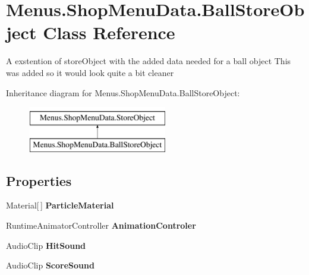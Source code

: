 \hypertarget{class_menus_1_1_shop_menu_data_1_1_ball_store_object}{}\section{Menus.\+Shop\+Menu\+Data.\+Ball\+Store\+Object Class Reference}
\label{class_menus_1_1_shop_menu_data_1_1_ball_store_object}


A exstention of store\+Object with the added data needed for a ball object This was added so it would look quite a bit cleaner  


Inheritance diagram for Menus.\+Shop\+Menu\+Data.\+Ball\+Store\+Object\+:\begin{figure}[H]
\begin{center}
\leavevmode
\includegraphics[height=2.000000cm]{class_menus_1_1_shop_menu_data_1_1_ball_store_object}
\end{center}
\end{figure}
\subsection*{Properties}
\begin{DoxyCompactItemize}
\item 
Material\mbox{[}$\,$\mbox{]} {\bfseries Particle\+Material}\hypertarget{class_menus_1_1_shop_menu_data_1_1_ball_store_object_a3b1cba2ae730d691d4ac40d58cf9113c}{}\label{class_menus_1_1_shop_menu_data_1_1_ball_store_object_a3b1cba2ae730d691d4ac40d58cf9113c}

\item 
Runtime\+Animator\+Controller {\bfseries Animation\+Controler}\hypertarget{class_menus_1_1_shop_menu_data_1_1_ball_store_object_a804f3abdad7315e197f31593bd869d12}{}\label{class_menus_1_1_shop_menu_data_1_1_ball_store_object_a804f3abdad7315e197f31593bd869d12}

\item 
Audio\+Clip {\bfseries Hit\+Sound}\hypertarget{class_menus_1_1_shop_menu_data_1_1_ball_store_object_a23e8730ad4dde7894da113c90a86ebea}{}\label{class_menus_1_1_shop_menu_data_1_1_ball_store_object_a23e8730ad4dde7894da113c90a86ebea}

\item 
Audio\+Clip {\bfseries Score\+Sound}\hypertarget{class_menus_1_1_shop_menu_data_1_1_ball_store_object_a350ab071bd64b096bccfedebd0005862}{}\label{class_menus_1_1_shop_menu_data_1_1_ball_store_object_a350ab071bd64b096bccfedebd0005862}

\end{DoxyCompactItemize}
